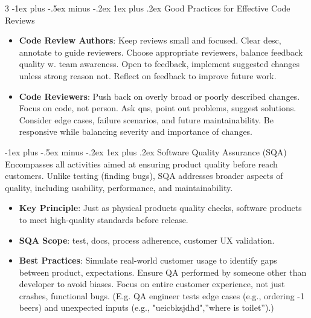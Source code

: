 \documentclass[a4paper, 10pt, landscape]{article}
\makeatletter
\renewcommand{\subsubsection}{\@startsection{subsubsection}{3}{0mm}%
                                {-1ex plus -.5ex minus -.2ex}%
                                {1ex plus .2ex}%
                                {\normalfont\small\bfseries}}
\makeatother
\begin{document}
\begin{multicols*}{3}
\subsubsection{Good Practices for Effective Code Reviews}
\begin{itemize}[itemsep=-1pt]
    \item \textbf{Code Review Authors}: Keep reviews small and focused. Clear desc, annotate to guide reviewers. Choose appropriate reviewers, balance feedback quality w. team awareness. Open to feedback, implement suggested changes unless strong reason not. Reflect on feedback to improve future work.
    \item \textbf{Code Reviewers}: Push back on overly broad or poorly described changes. Focus on code, not person. Ask qns, point out problems, suggest solutions. Consider edge cases, failure scenarios, and future maintainability. Be responsive while balancing severity and importance of changes.
\end{itemize}

\subsubsection{Software Quality Assurance (SQA)}
Encompasses all activities aimed at ensuring product quality before reach customers. Unlike testing (finding bugs), SQA addresses broader aspects of quality, including usability, performance, and maintainability.
\begin{itemize}
    \item \textbf{Key Principle}: Just as physical products quality checks, software products to meet high-quality standards before release.
    \item \textbf{SQA Scope}: test, docs, process adherence, customer UX validation.
    \item \textbf{Best Practices}: Simulate real-world customer usage to identify gaps between product, expectations. Ensure QA performed by someone other than developer to avoid biases. Focus on entire customer experience, not just crashes, functional bugs. (E.g. QA engineer tests edge cases (e.g., ordering -1 beers) and unexpected inputs (e.g., "ueicbksjdhd",''where is toilet'').)
\end{itemize}


\end{multicols*}
\end{document}
